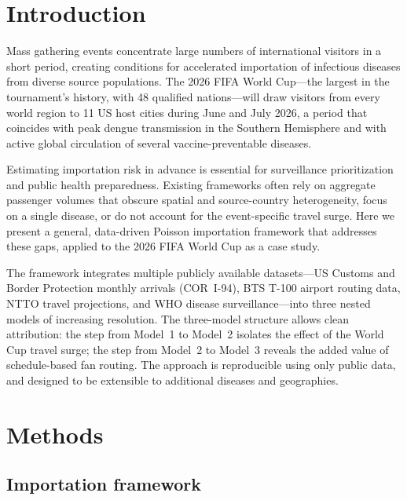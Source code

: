 \documentclass[12pt]{article}
\begin{document}
\section*{Introduction}

Mass gathering events concentrate large numbers of international
visitors in a short period, creating conditions for accelerated
importation of infectious diseases from diverse source populations.
The 2026 FIFA World Cup---the largest in the tournament's history,
with 48 qualified nations---will draw visitors from every world
region to 11 US host cities during June and July 2026, a period
that coincides with peak dengue transmission in the Southern
Hemisphere and with active global circulation of several
vaccine-preventable diseases.

Estimating importation risk in advance is essential for surveillance
prioritization and public health preparedness. Existing frameworks
often rely on aggregate passenger volumes that obscure spatial and
source-country heterogeneity, focus on a single disease, or do not
account for the event-specific travel surge. Here we present a
general, data-driven Poisson importation framework that addresses
these gaps, applied to the 2026 FIFA World Cup as a case study.

The framework integrates multiple publicly available datasets---US
Customs and Border Protection monthly arrivals (COR~I-94), BTS T-100
airport routing data, NTTO travel projections, and WHO disease
surveillance---into three nested models of increasing resolution. The
three-model structure allows clean attribution: the step from Model~1
to Model~2 isolates the effect of the World Cup travel surge; the
step from Model~2 to Model~3 reveals the added value of
schedule-based fan routing. The approach is reproducible using only
public data, and designed to be extensible to additional diseases and
geographies.

\section*{Methods}

\subsection*{Importation framework}
\end{document}
